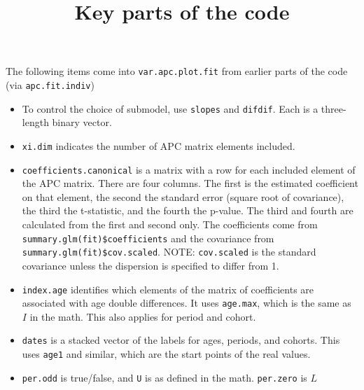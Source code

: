 \documentclass{article}
\title{Key parts of the code}
\begin{document}
\maketitle

The following items come into \texttt{var.apc.plot.fit} from earlier parts of the code (via \texttt{apc.fit.indiv})
\begin{itemize}
\item To control the choice of submodel, use \texttt{slopes} and \texttt{difdif}. Each is a three-length binary vector.
\item \texttt{xi.dim} indicates the number of APC matrix elements included.
\item \texttt{coefficients.canonical} is a matrix with a row for each included element of the APC matrix. There are four columns. The first is the estimated coefficient on that element, the second the standard error (square root of covariance), the third the t-statistic, and the fourth the p-value. The third and fourth are calculated from the first and second only. The coefficients come from \texttt{summary.glm(fit)\$coefficients} and the covariance from \texttt{summary.glm(fit)\$cov.scaled}. NOTE: \texttt{cov.scaled} is the standard covariance unless the dispersion is specified to differ from 1.
\item \texttt{index.age} identifies which elements of the matrix of coefficients are associated with age double differences. It uses \texttt{age.max}, which is the same as $I$ in the math. This also applies for period and cohort.
\item \texttt{dates} is a stacked vector of the labels for ages, periods, and cohorts. This uses \texttt{age1} and similar, which are the start points of the real values.
\item \texttt{per.odd} is true/false, and \texttt{U} is as defined in the math. \texttt{per.zero} is $L$
\end{itemize}
\end{document}
